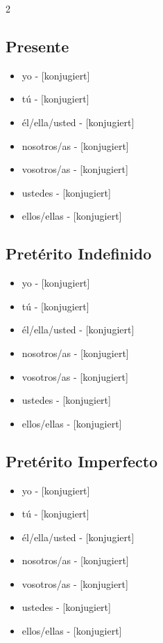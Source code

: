 \documentclass[12pt,a4paper]{article}
\begin{document}
\begin{multicols}{2}

\subsection*{Presente}
\begin{itemize}[leftmargin=*]
    \item yo - [konjugiert]
    \item tú - [konjugiert]
    \item él/ella/usted - [konjugiert]
    \item nosotros/as - [konjugiert]
    \item vosotros/as - [konjugiert]
    \item ustedes - [konjugiert]
    \item ellos/ellas - [konjugiert]
\end{itemize}

\subsection*{Pretérito Indefinido}
\begin{itemize}[leftmargin=*]
    \item yo - [konjugiert]
    \item tú - [konjugiert]
    \item él/ella/usted - [konjugiert]
    \item nosotros/as - [konjugiert]
    \item vosotros/as - [konjugiert]
    \item ustedes - [konjugiert]
    \item ellos/ellas - [konjugiert]
\end{itemize}

\subsection*{Pretérito Imperfecto}
\begin{itemize}[leftmargin=*]
    \item yo - [konjugiert]
    \item tú - [konjugiert]
    \item él/ella/usted - [konjugiert]
    \item nosotros/as - [konjugiert]
    \item vosotros/as - [konjugiert]
    \item ustedes - [konjugiert]
    \item ellos/ellas - [konjugiert]
\end{itemize}


\end{multicols}
\end{document}
